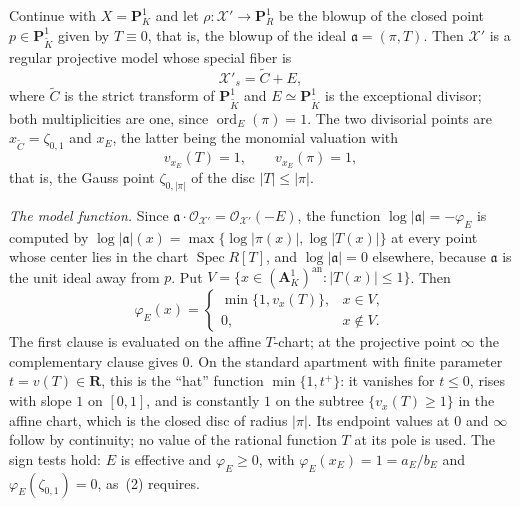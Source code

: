 \begin{example}
\label{ex:metrics-p1-blowup}
Continue with $X=\mathbf P^1_K$ and let
$\rho:\mathcal X'\to\mathbf P^1_R$ be the blowup of the closed point
$p\in\mathbf P^1_{\widetilde K}$ given by $T\equiv0$, that is, the
blowup of the ideal $\mathfrak a=(\pi,T)$. Then $\mathcal X'$ is a
regular projective model whose special fiber is
\[
 \mathcal X'_s=\widetilde C+E,
\]
where $\widetilde C$ is the strict transform of
$\mathbf P^1_{\widetilde K}$ and $E\simeq\mathbf P^1_{\widetilde K}$ is
the exceptional divisor; both multiplicities are one, since
$\operatorname{ord}_E(\pi)=1$. The two divisorial points are
$x_{\widetilde C}=\zeta_{0,1}$ and $x_E$, the latter being the monomial
valuation with
\[
 v_{x_E}(T)=1,\qquad v_{x_E}(\pi)=1,
\]
that is, the Gauss point $\zeta_{0,|\pi|}$ of the disc $|T|\le|\pi|$.

\emph{The model function.} Since $\mathfrak a\cdot\mathcal O_{\mathcal X'}
=\mathcal O_{\mathcal X'}(-E)$, the function
$\log|\mathfrak a|=-\varphi_E$ is computed by
$\log|\mathfrak a|(x)=\max\{\log|\pi(x)|,\log|T(x)|\}$ at every point
whose center lies in the chart $\operatorname{Spec}R[T]$, and
$\log|\mathfrak a|=0$ elsewhere, because $\mathfrak a$ is the unit ideal
away from $p$. Put
$V=\{x\in(\mathbf A^1_K)^{\mathrm{an}}:|T(x)|\le1\}$. Then
\begin{equation}
\label{eq:metrics-p1-blowup-hat}
 \varphi_E(x)=
 \begin{cases}
 \min\{1,v_x(T)\},&x\in V,\\
 0,&x\notin V.
 \end{cases}
\end{equation}
The first clause is evaluated on the affine $T$-chart; at the projective
point $\infty$ the complementary clause gives $0$. On the standard
apartment with finite parameter $t=v(T)\in\mathbf R$, this is the
``hat'' function $\min\{1,t^+\}$: it vanishes for $t\le0$,
rises with slope $1$ on $[0,1]$, and is constantly $1$ on the subtree
$\{v_x(T)\ge1\}$ in the affine chart, which is the closed disc of radius
$|\pi|$. Its endpoint values at $0$ and $\infty$ follow by continuity;
no value of the rational function $T$ at its pole is used. The sign
tests hold: $E$ is effective and $\varphi_E\ge0$, with
$\varphi_E(x_E)=1=a_E/b_E$ and $\varphi_E(\zeta_{0,1})=0$, as
\,(2) requires.


\end{example}
